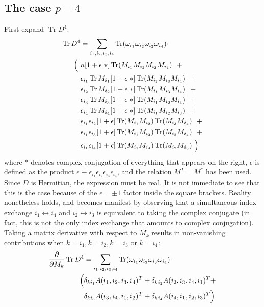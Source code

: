\documentclass[12pt,a4paper]{article}
\DeclareMathOperator{\Tr}{Tr}
\begin{document}
\subsection{The case $p=4$}
First expand $\Tr D^4$:
\begin{align}\label{eq:trd4}
\Tr D^4 &= \sum_{i_1, i_2, i_3, i_4} \Tr (\omega_{i_1} \omega_{i_2} \omega_{i_3} \omega_{i_4}) \cdot \notag \\
\Big( \ &n [1+\epsilon \ *] \Tr (M_{i_1} M_{i_2} M_{i_3} M_{i_4})  \ \  + \notag \\
&\epsilon_{i_1} \Tr M_{i_1} [1 + \epsilon \ *] \Tr ( M_{i_2} M_{i_3} M_{i_4})  \ \  + \notag \\
&\epsilon_{i_2} \Tr M_{i_2} [1  + \epsilon \ *] \Tr (M_{i_1} M_{i_3} M_{i_4}) \ \  + \notag \\
&\epsilon_{i_3} \Tr M_{i_3} [1 + \epsilon \ *] \Tr (M_{i_1} M_{i_2} M_{i_4})  \ \  + \notag \\
&\epsilon_{i_4} \Tr M_{i_4} [1 + \epsilon \ *] \Tr (M_{i_1} M_{i_2} M_{i_3})  \ \  + \notag \\
&\epsilon_{i_1} \epsilon_{i_2} [1 + \epsilon] \Tr (M_{i_1} M_{i_2} ) \Tr (M_{i_3} M_{i_4})   \ \  + \notag \\
&\epsilon_{i_1} \epsilon_{i_3} [1 + \epsilon] \Tr (M_{i_1} M_{i_3}) \Tr (M_{i_2} M_{i_4})   \ \  + \notag \\
&\epsilon_{i_1} \epsilon_{i_4} [1 + \epsilon] \Tr (M_{i_1} M_{i_4}) \Tr (M_{i_2} M_{i_3})   \ \Big)
\end{align}
where $*$ denotes complex conjugation of everything that appears on the right, $\epsilon$ is defined as the product $\epsilon \equiv \epsilon_{i_1}\epsilon_{i_2}\epsilon_{i_3}\epsilon_{i_4}$, and the relation $M^T = M^*$ has been used. Since $D$ is Hermitian, the expression must be real. It is not immediate to see that this is the case because of the $\epsilon = \pm 1$ factor inside the square brackets. Reality nonetheless holds, and becomes manifest by observing that a simultaneous index exchange $i_1 \leftrightarrow i_4$ and $i_2 \leftrightarrow i_3$ is equivalent to taking the complex conjugate (in fact, this is not the only index exchange that amounts to complex conjugation). \newline
Taking a matrix derivative with respect to $M_k$ results in non-vanishing contributions when $k=i_1, k=i_2, k=i_3$ or $k=i_4$:
\begin{align} \label{eq:derd4}
\frac{\partial}{\partial M_k} \Tr D^4 &= \sum_{i_1, i_2, i_3, i_4} \Tr (\omega_{i_1} \omega_{i_2} \omega_{i_3} \omega_{i_4}) \cdot \notag \\
\Big( &\delta_{ki_1} A(i_1, i_2, i_3, i_4)^T + \delta_{ki_2} A(i_2, i_3, i_4, i_1)^T + \notag \\
&\delta_{ki_3} A(i_3, i_4, i_1, i_2)^T + \delta_{ki_4} A(i_4, i_1, i_2, i_3)^T \Big)
\end{align}
\end{document}
